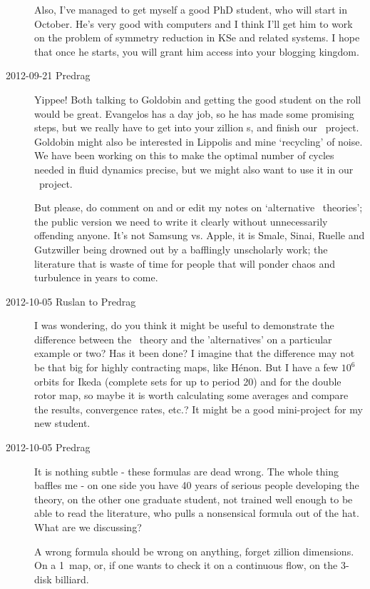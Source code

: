 \begin{description}
Also, I've managed to get myself a good PhD student, who will start in
October.  He's very good with computers and I think I'll get him to work
on the problem of symmetry reduction in KSe and related systems.  I hope
that once he starts, you will grant him access into your blogging
kingdom.

\item[2012-09-21 Predrag] Yippee! Both talking to
{Goldobin} and getting the good student on the roll would be great.
Evangelos has a day job, so he has made some promising steps, but we
really have to get into your zillion \rpo s, and finish our \KS\ project.
Goldobin might also be interested in Lippolis and mine
`recycling' of noise. We have been working on this
to make the optimal number of cycles needed in fluid dynamics precise,
but we might also want to use it in our \KS\ project.

But please, do comment on and or edit my  notes
on `alternative \po\ theories'; the public version we need to write it
clearly without unnecessarily offending anyone. It's not Samsung vs.
Apple, it is Smale, Sinai, Ruelle and Gutzwiller being drowned out by a
bafflingly unscholarly work; the literature that is waste of time for
people that will ponder chaos and turbulence in years to come.

\item[2012-10-05 Ruslan to Predrag]
I was wondering, do you think it might be useful to demonstrate the
difference between the \po\ theory and the 'alternatives' on a particular
example or two?  Has it been done?  I imagine that the difference may not
be that big for highly contracting maps, like H\'enon.  But I have a few
$10^6$ orbits for Ikeda (complete sets for up to period 20) and for the
double rotor map, so maybe it is worth calculating some averages and
compare the results, convergence rates, etc.?  It might be a good
mini-project for my new student.

\item[2012-10-05 Predrag] It is nothing subtle - these formulas are dead
wrong. The whole thing baffles me - on one side you have 40 years of
serious people developing the theory, on the other one graduate student,
not trained well enough to be able to read the literature,  who pulls
a nonsensical formula out of the hat. What are we discussing?

A wrong formula should be wrong on anything, forget zillion dimensions.
On a 1\dmn\ map, or, if one wants to check it on a continuous flow, on
the 3-disk billiard.


\end{description}
